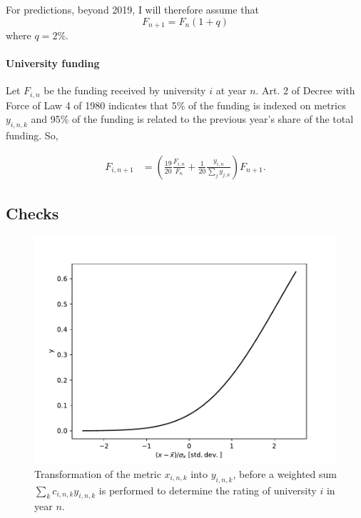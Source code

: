 \documentclass[twocolumn]{article}
\begin{document}
For predictions, beyond 2019, I will therefore assume that
\begin{equation}
    F_{n+1} = F_n (1 + q) \label{eq:F}
\end{equation}
where $q = 2$\%.

\paragraph{University funding}
Let $F_{i,n}$ be the funding received by university $i$ at year $n$. Art. 2 of
Decree with Force of Law 4 of 1980 indicates that 5\% of the funding is indexed
on metrics $y_{i,n,k}$ and 95\% of the funding is related to the previous year's
share of the total funding.  So,

\begin{align}
    F_{i,n+1} &= \left( \frac{19}{20} \frac{F_{i,n}}{F_{n}} 
                      + \frac 1{20} \frac{y_{i,n}}{\sum_j y_{j,n}} 
                \right) F_{n+1}.
        \label{eq:afd}
\end{align}


\subsection{Checks}
\begin{figure}
\centering
\includegraphics[width=.85\linewidth]{pdf/transform.pdf}
\caption{Transformation of the metric $x_{i,n,k}$ into $y_{i,n,k}$, before a weighted sum 
$\sum_k c_{i,n,k} y_{i,n,k}$ is performed to determine the rating of university $i$ in year $n$.}
\label{fig:transform}
\end{figure}
\end{document}
